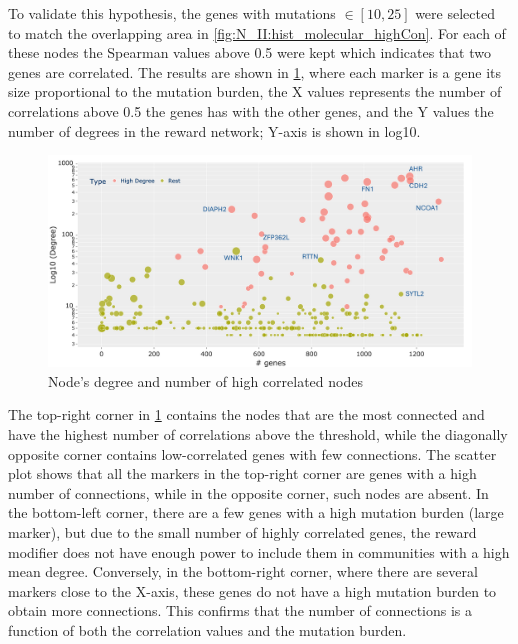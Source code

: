 To validate this hypothesis, the genes with mutations $\in[10,25]$ were selected to match the overlapping area in \cref{fig:N_II:hist_molecular_highCon}. For each of these nodes the Spearman values above 0.5 were kept which indicates that two genes are correlated. The results are shown in \cref{fig:N_II:degree_high_corr}, where each marker is a gene its size proportional to the mutation burden, the X values represents the number of correlations above 0.5 the genes has with the other genes, and the Y values the number of degrees in the reward network; Y-axis is shown in log10. 

\begin{figure}[!htb]    
    \centering
    \includegraphics[width=1.0\textwidth,height=1.0\textheight,keepaspectratio]{Sections/Network_II/resources/reward/Degree_highCorrGenes_labeled.png}
    \caption{Node's degree and number of high correlated nodes}
    \label{fig:N_II:degree_high_corr}
\end{figure}

The top-right corner in \cref{fig:N_II:degree_high_corr} contains the nodes that are the most connected and have the highest number of correlations above the threshold, while the diagonally opposite corner contains low-correlated genes with few connections. The scatter plot shows that all the markers in the top-right corner are genes with a high number of connections, while in the opposite corner, such nodes are absent. In the bottom-left corner, there are a few genes with a high mutation burden (large marker), but due to the small number of highly correlated genes, the reward modifier does not have enough power to include them in communities with a high mean degree. Conversely, in the bottom-right corner, where there are several markers close to the X-axis, these genes do not have a high mutation burden to obtain more connections. This confirms that the number of connections is a function of both the correlation values and the mutation burden.

